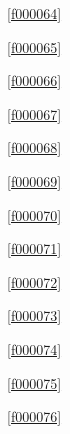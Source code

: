 \noindent\filesourcenumbernameone\ \ref{f000064}\dotfill\pageref{f000064}%

\noindent\filesourcenumbernameone\ \ref{f000065}\dotfill\pageref{f000065}%

\noindent\filesourcenumbernameone\ \ref{f000066}\dotfill\pageref{f000066}%

\noindent\filesourcenumbernameone\ \ref{f000067}\dotfill\pageref{f000067}%

\noindent\filesourcenumbernameone\ \ref{f000068}\dotfill\pageref{f000068}%

\noindent\filesourcenumbernameone\ \ref{f000069}\dotfill\pageref{f000069}%

\noindent\filesourcenumbernameone\ \ref{f000070}\dotfill\pageref{f000070}%

\noindent\filesourcenumbernameone\ \ref{f000071}\dotfill\pageref{f000071}%

\noindent\filesourcenumbernameone\ \ref{f000072}\dotfill\pageref{f000072}%

\noindent\filesourcenumbernameone\ \ref{f000073}\dotfill\pageref{f000073}%

\noindent\filesourcenumbernameone\ \ref{f000074}\dotfill\pageref{f000074}%

\noindent\filesourcenumbernameone\ \ref{f000075}\dotfill\pageref{f000075}%

\noindent\filesourcenumbernameone\ \ref{f000076}\dotfill\pageref{f000076}%









